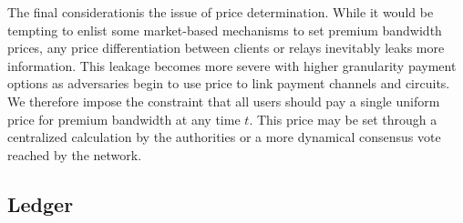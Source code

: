 The final considerationis the issue of price determination. While it
would be tempting to enlist some market-based mechanisms to set premium
bandwidth prices, any price differentiation between clients or relays inevitably
leaks more information. This leakage becomes more severe with higher granularity
payment options as adversaries begin to use price to link payment channels and
circuits. We therefore impose the constraint that all users should pay a single
uniform price for premium bandwidth at any time $t$. This price may be set
through a centralized calculation by the authorities or a more dynamical
consensus vote reached by the network.



%


\subsection{Ledger}

